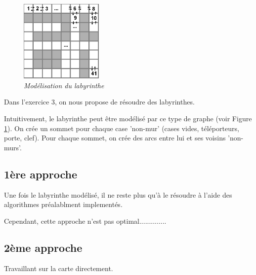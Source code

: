\documentclass[10pt]{article}
\begin{document}
		\begin{figure}
			\includegraphics[height=4.0cm]{./images/lab.png}
			\caption{\textit{Modélisation du labyrinthe}}
			\label{modelisationlab}
		\end{figure}
		
		Dans l'exercice 3, on nous propose de résoudre des labyrinthes.\newline
		
		Intuitivement, le labyrinthe peut être modélisé par ce type de graphe (voir Figure \ref{modelisationlab}).
		On crée un sommet pour chaque case 'non-mur' (cases vides, téléporteurs, porte, clef).
		Pour chaque sommet, on crée des arcs entre lui et ses voisins 'non-murs'.\newline

		\subsection{1ère approche}
			Une fois le labyrinthe modélisé, il ne reste plus qu'à le résoudre à l'aide des algorithmes préalablment implementés.\newline
			
			Cependant, cette approche n'est pas optimal..............

		\subsection{2ème approche}
			Travaillant sur la carte directement.
			
\end{document}
